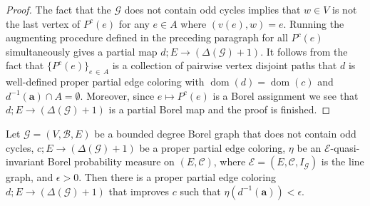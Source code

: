 \documentclass[AHL,Unicode,longabstracts,published]{cedram}
\DeclareMathOperator{\dom}{dom}
\newcommand{\bfa}{\mathbf{a}}
\newcommand{\clG}{\mathcal{G}}
\newcommand{\clB}{\mathcal{B}}
\newcommand{\clE}{\mathcal{E}}
\newcommand{\clC}{\mathcal{C}}
\newcommand{\clG}{\mathcal{G}}
\begin{document}
\begin{proof}
The fact that the $\clG$ does not contain odd cycles implies that $w\in V$ is not the last vertex of $P^c(e)$ for any $e\in A$ where $(v(e),w)=e$. Running the augmenting procedure defined in the preceding paragraph for all $P^c(e)$ simultaneously gives a partial map $d;E\to (\Delta(\clG)+1)$. It follows from the fact that $\{P^c(e)\}_{e\,\in\,A}$ is a collection of pairwise vertex disjoint paths that $d$ is well-defined proper partial edge coloring with $\dom(d)=\dom(c)$ and $d^{-1}(\bfa)\cap A=\emptyset$. Moreover, since $e\mapsto P^c(e)$ is a Borel assignment we see that $d;E\to (\Delta(\clG)+1)$ is a partial Borel map and the proof is finished.
\end{proof}

\begin{prop}\label{pr:main}
Let $\clG=(V,\clB,E)$ be a bounded degree Borel graph that does not contain odd cycles, $c;E\to (\Delta(\clG)+1)$ be a proper partial edge coloring, $\eta$ be an $\clE$-quasi-invariant Borel probability measure on $(E,\clC)$, where $\clE=(E,\clC,I_\clG)$ is the line graph, and $\epsilon>0$. Then there is a proper partial edge coloring $d;E\to (\Delta(\clG)+1)$ that improves $c$ such that $\eta(d^{-1}(\bfa))<\epsilon$.
\end{prop}
\end{document}
